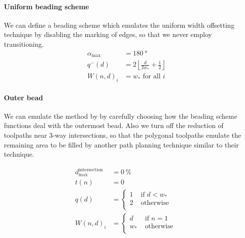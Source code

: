 \paragraph{Uniform beading scheme}
We can define a beading scheme which emulates the uniform width offsetting technique by disabling the marking of edges, so that we never employ transitioning.
\begin{align*}
\alpha_\text{max} &= \SI{180}{\degree} \\
q^-(d) &= 2 \left\lfloor \frac{d}{ 2w_*} + \frac12 \right\rfloor \\
W(n,d)_i &= w_* \text{ for all } i 
\end{align*}



\paragraph{Outer bead}
We can emulate the method by \citeauthor{Moesen2011} by carefully choosing how the beading scheme functions deal with the outermost bead.
Also we turn off the reduction of toolpaths near 3-way intersections, so that the polygonal toolpaths emulate the remaining area to be filled by another path planning technique similar to their technique.

\begin{align*}
d_\text{max}^\text{intersection} &= \SI{0}{\percent} \\
t(n) &= 0 \\
q(d) &=
\begin{cases}
1 & \text{ if } d < w_* \\
2 & \text{ otherwise } \\
\end{cases}
 \\
W(n,d)_i &= 
\begin{cases}
d & \text{ if } n = 1 \\
w_* & \text{ otherwise } \\
\end{cases}
\end{align*}


